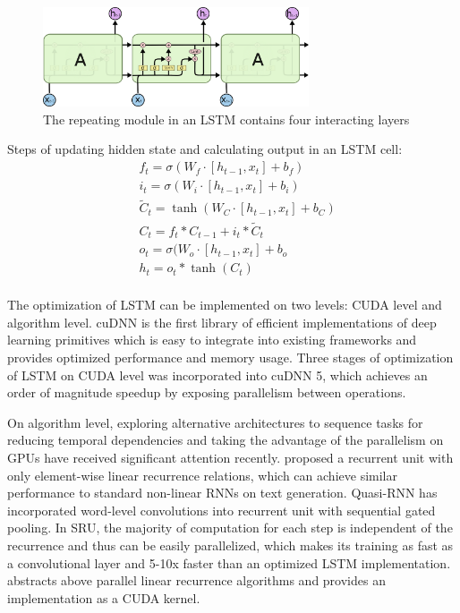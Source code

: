 \documentclass{article}
\begin{document}
\begin{figure}[h]
\centering
\includegraphics[width=0.7\textwidth]{lstm}
\caption{The repeating module in an LSTM contains four interacting layers\cite{understandLSTM}}
\end{figure}

Steps of updating hidden state and calculating output in an LSTM cell:
\begin{equation}
  \begin{split}
    & f_t=\sigma(W_f\cdot [h_{t-1},x_t]+b_f) \\
    & i_t=\sigma(W_i\cdot [h_{t-1},x_t]+b_i) \\
    & \widetilde{C}_t=\tanh(W_C\cdot [h_{t-1},x_t]+b_C) \\
    & C_t=f_t * C_{t-1}+i_t * \widetilde{C}_t \\
    & o_t=\sigma(W_o\cdot [h_{t-1},x_t]+b_o \\
    & h_t=o_t * \tanh(C_t) \\
  \end{split}
\end{equation}



The optimization of LSTM can be implemented on two levels: CUDA level and algorithm level. cuDNN\cite{chetlur2014cudnn} is the first library of efficient implementations of deep learning primitives which is easy to integrate into existing frameworks and provides optimized performance and memory usage. Three stages of optimization of LSTM on CUDA level was incorporated into cuDNN 5, which achieves an order of magnitude speedup by exposing parallelism between operations.

On algorithm level, exploring alternative architectures to sequence tasks for reducing temporal dependencies and taking the advantage of the parallelism on GPUs have received significant attention recently\cite{chang2017dilated, kaiser2016can, kaiser2015neural, gehring2016convolutional, gehring2017convolutional, kalchbrenner2016neural}. 
\cite{Balduzzi:2016:SRN:3045390.3045527} proposed a recurrent unit with only element-wise linear recurrence relations, which can achieve similar performance to standard non-linear RNNs on text generation.
\cite{bradbury2016quasi} Quasi-RNN has incorporated word-level convolutions into recurrent unit with sequential gated pooling. 
In SRU\cite{lei2017training}, the majority of computation for each step is independent of the recurrence and thus can be easily parallelized, which makes its training as fast as a convolutional layer and 5-10x faster than an optimized LSTM implementation. 
\cite{martin2017parallelizing}abstracts above parallel linear recurrence algorithms and provides an implementation as a CUDA kernel.
\end{document}
